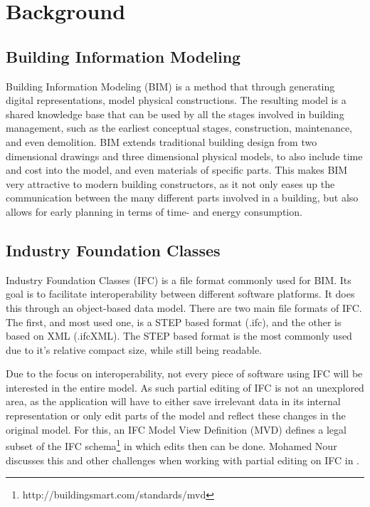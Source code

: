 \section{Background}
\subsection{Building Information Modeling}
Building Information Modeling (BIM) is a method that through generating digital representations, model physical constructions. The resulting model is a shared knowledge base that can be used by all the stages involved in building management, such as the earliest conceptual stages, construction, maintenance, and even demolition. BIM extends traditional building design from two dimensional drawings and three dimensional physical models, to also include time and cost into the model, and even materials of specific parts. This makes BIM very attractive to modern building constructors, as it not only eases up the communication between the many different parts involved in a building, but also allows for early planning in terms of time- and energy consumption.
\subsection{Industry Foundation Classes}
Industry Foundation Classes (IFC) is a file format commonly used for BIM. Its goal is to facilitate interoperability between different software platforms. It does this through an object-based data model. There are two main file formats of IFC. The first, and most used one, is a STEP based format (.ifc), and the other is based on XML (.ifcXML). The STEP based format is the most commonly used due to it's relative compact size, while still being readable.

Due to the focus on interoperability, not every piece of software using IFC will be interested in the entire model. As such partial editing of IFC is not an unexplored area, as the application will have to either save irrelevant data in its internal representation or only edit parts of the model and reflect these changes in the original model. For this, an IFC Model View Definition (MVD) defines a legal subset of the IFC schema\footnote{http://buildingsmart.com/standards/mvd} in which edits then can be done. Mohamed Nour discusses this and other challenges when working with partial editing on IFC in \cite{nour08}.

